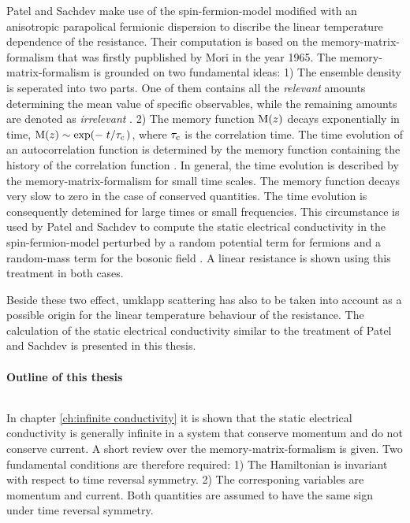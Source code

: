Patel and Sachdev \cite{Patel&Sachdev} make use of the spin-fermion-model modified with an \linebreak anisotropic parapolical fermionic dispersion to discribe the linear temperature dependence of the resistance.
Their computation is based on the memory-matrix-formalism that was firstly pupblished by Mori \cite{Mori} in the year 1965.
The memory-matrix-formalism is grounded on two fundamental ideas: 
1) The ensemble density is seperated into two parts.
One of them contains all the \emph{relevant} amounts determining the mean value of specific observables, while the remaining amounts are denoted as \emph{irrelevant} \cite{Zwanzig}.
2) The memory function $\mathrm{M}(z)$ decays exponentially in time, $\mt{M}(z) \sim \exp(-\flatfrac{t}{\tau_{\mt{c}}})$, where $\tau_{\mathrm{c}}$ is the correlation time.
The time evolution of an autocorrelation function is determined by the memory function containing the history of the correlation function \cite{Berne&Boob&Rice}.
In general, the time evolution is described by the memory-matrix-formalism for small time scales.
The memory function decays very slow to zero in the case of conserved quantities.
The time evolution is consequently detemined for large times or small frequencies.
This circumstance is used by Patel and Sachdev to compute the static electrical conductivity in the spin-fermion-model perturbed by a random potential term for fermions and a random-mass term for the bosonic field \cite{Patel&Sachdev}.
A linear resistance is shown using this treatment in both cases.

Beside these two effect, umklapp scattering has also to be taken into account as a possible origin for the linear temperature behaviour of the resistance.
The calculation of the static electrical conductivity similar to the treatment of Patel and Sachdev is presented in this thesis.

\paragraph{Outline of this thesis}$\:$\vspace{3.5ex}

In chapter \ref{ch:infinite conductivity} it is shown that the static electrical conductivity is generally infinite in a system that conserve momentum and do not conserve current. 
A short review over the memory-matrix-formalism is given.
Two fundamental conditions are therefore required: 
1) The Hamiltonian is invariant with respect to time reversal symmetry.
2) The corresponing variables are momentum and current.
Both quantities are assumed to have the same sign under time reversal symmetry.

